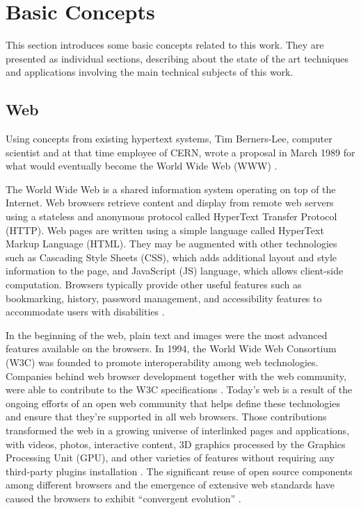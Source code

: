 \chapter{Basic Concepts} %
\label{cha:basic_concepts}

This section introduces some basic concepts related to this work. They are presented as individual sections, describing about the state of the art techniques and applications involving the main technical subjects of this work.

%
%
\section{Web} %
\label{sec:basic_concepts:web}

Using concepts from existing hypertext systems, Tim Berners-Lee, computer scientist and at that time employee of CERN, wrote a proposal in March 1989 for what would eventually become the World Wide Web (WWW) \cite{WC2006}.

The World Wide Web is a shared information system operating on top of the Internet. Web browsers retrieve content and display from remote web servers using a stateless and anonymous protocol called HyperText Transfer Protocol (HTTP). Web pages are written using a simple language called HyperText Markup Language (HTML). They may be augmented with other technologies such as Cascading Style Sheets (CSS), which adds additional layout and style information to the page, and JavaScript (JS) language, which allows client-side computation. Browsers typically provide other useful features such as bookmarking, history, password management, and accessibility features to accommodate users with disabilities \cite{Grosskurth2005}.

In the beginning of the web, plain text and images were the most advanced features available on the browsers. In 1994, the World Wide Web Consortium (W3C) was founded to promote interoperability among web technologies. Companies behind web browser development together with the web community, were able to contribute to the W3C specifications \cite{WC2006}. Today's web is a result of the ongoing efforts of an open web community that helps define these technologies and ensure that they're supported in all web browsers. Those contributions transformed the web in a growing universe of interlinked pages and applications, with videos, photos, interactive content, 3D graphics processed by the Graphics Processing Unit (GPU), and other varieties of features without requiring any third-party plugins installation \cite{Hickson2013}. The significant reuse of open source components among different browsers and the emergence of extensive web standards have caused the browsers to exhibit ``convergent evolution'' \cite{Grosskurth2005}.


